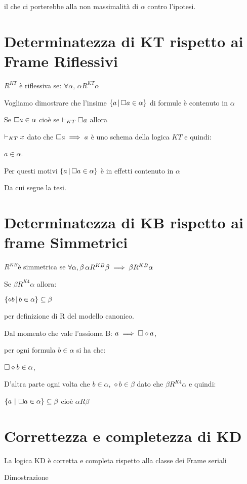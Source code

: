 il che ci porterebbe alla non massimalità di $\alpha$ contro l'ipotesi.
\lightning


\section{Determinatezza di KT rispetto ai Frame Riflessivi}

$R^{KT}$ è riflessiva se: $\forall\alpha,\,\alpha R^{KT}\alpha$

Vogliamo dimostrare che l'insime $\{a\,|\,\square a\in\alpha\}$ di formule
è contenuto in $\alpha$

Se $\square a\in\alpha$ cioè se $\vdash_{KT}\square a$ allora

$\vdash_{KT}x$ dato che $\square a\implies a$ è uno schema della
logica $KT$ e quindi:

$a\in\alpha$.

Per questi motivi $\{a\,|\,\square a\in\alpha\}$ è in effetti contenuto
in $\alpha$

Da cui segue la tesi.


\section{Determinatezza di KB rispetto ai frame Simmetrici}

$R^{KB}$è simmetrica se $\forall\alpha,\beta\,\alpha R^{KB}\beta\implies\beta R^{KB}\alpha$

Se $\beta R^{K4}\alpha$ allora:

$\{\diamond b\,|\, b\in\alpha\}\subseteq\beta$

per definizione di R del modello canonico.

Dal momento che vale l'assioma B: $a\implies\square\diamond a$,

per ogni formula $b\in\alpha$ si ha che:

$\square\diamond b\in\alpha$,

D'altra parte ogni volta che $b\in\alpha$, $\diamond b\in\beta$
dato che $\beta R^{K4}\alpha$ e quindi:

$\{a\ |\ \square a\in\alpha\}\subseteq\beta$ cioè $\alpha R\beta$


\section{Correttezza e completezza di KD}

La logica KD è corretta e completa rispetto alla classe dei Frame
seriali

Dimostrazione

